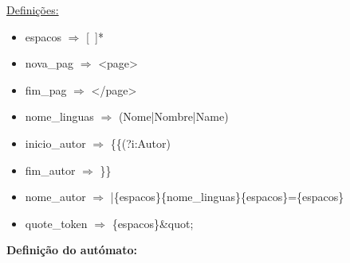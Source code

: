 \documentclass[11pt,a4paper]{report}
\begin{document}
\underline{Definições: }
\begin{itemize}
	\item espacos $\Rightarrow$ [\ ]*
	\item nova\_pag $\Rightarrow$ <page>
	\item fim\_pag $\Rightarrow$ </page>
	\item nome\_linguas $\Rightarrow$ (Nome|Nombre|Name)
	\item inicio\_autor $\Rightarrow$ \{\{(?i:Autor)
	\item fim\_autor $\Rightarrow$ \}\}
	\item nome\_autor $\Rightarrow$ |\{espacos\}\{nome\_linguas\}\{espacos\}=\{espacos\}
	\item quote\_token $\Rightarrow$ \{espacos\}\&quot;
\end{itemize}

\vspace{0.5cm}

\textbf{Definição do autómato:}
\end{document}
